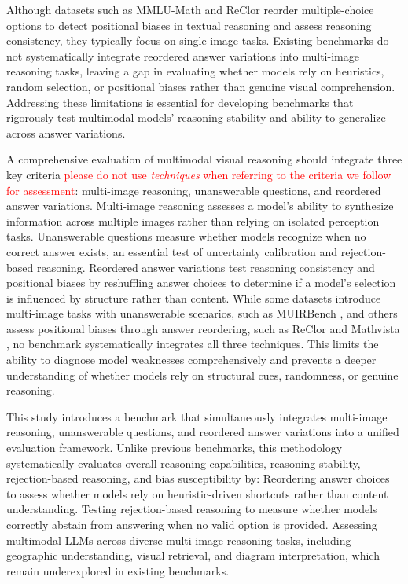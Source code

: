 Although datasets such as MMLU-Math \cite{mathmmlu2023} and ReClor \cite{yu2020reclor} reorder multiple-choice options to detect positional biases in textual reasoning and assess reasoning consistency, they typically focus on single-image tasks. Existing benchmarks do not systematically integrate reordered answer variations into multi-image reasoning tasks, leaving a gap in evaluating whether models rely on heuristics, random selection, or positional biases rather than genuine visual comprehension. Addressing these limitations is essential for developing benchmarks that rigorously test multimodal models' reasoning stability and ability to generalize across answer variations.


A comprehensive evaluation of multimodal visual reasoning should integrate three key criteria \textcolor{red}{please do not use \textit{techniques} when referring to the criteria we follow for assessment}: multi-image reasoning, unanswerable questions, and reordered answer variations. Multi-image reasoning assesses a model’s ability to synthesize information across multiple images rather than relying on isolated perception tasks. Unanswerable questions measure whether models recognize when no correct answer exists, an essential test of uncertainty calibration and rejection-based reasoning. Reordered answer variations test reasoning consistency and positional biases by reshuffling answer choices to determine if a model's selection is influenced by structure rather than content. While some datasets introduce multi-image tasks with unanswerable scenarios, such as MUIRBench \cite{wang2024muirbench}, and others assess positional biases through answer reordering, such as ReClor \cite{yu2020reclor} and Mathvista \cite{mathvista}, no benchmark systematically integrates all three techniques. This limits the ability to diagnose model weaknesses comprehensively and prevents a deeper understanding of whether models rely on structural cues, randomness, or genuine reasoning.


This study introduces a benchmark that simultaneously integrates multi-image reasoning, unanswerable questions, and reordered answer variations into a unified evaluation framework. Unlike previous benchmarks, this methodology systematically evaluates overall reasoning capabilities, reasoning stability, rejection-based reasoning, and bias susceptibility by: Reordering answer choices to assess whether models rely on heuristic-driven shortcuts rather than content understanding. Testing rejection-based reasoning to measure whether models correctly abstain from answering when no valid option is provided. Assessing multimodal LLMs across diverse multi-image reasoning tasks, including geographic understanding, visual retrieval, and diagram interpretation, which remain underexplored in existing benchmarks.

